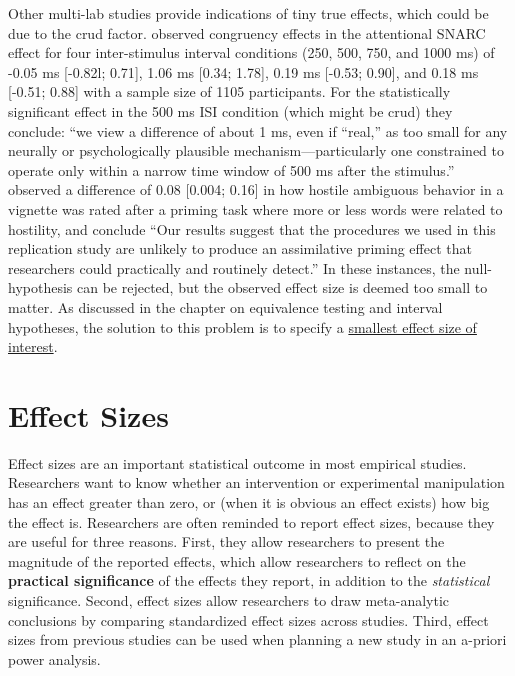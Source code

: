 \documentclass[
  oneside]{krantz}
\begin{document}
Other multi-lab studies provide indications of tiny true effects, which could be due to the crud factor. \citet{colling_registered_2020} observed congruency effects in the attentional SNARC effect for four inter-stimulus interval conditions (250, 500, 750, and 1000 ms) of -0.05 ms {[}-0.82l; 0.71{]}, 1.06 ms {[}0.34; 1.78{]}, 0.19 ms {[}-0.53; 0.90{]}, and 0.18 ms {[}-0.51; 0.88{]} with a sample size of 1105 participants. For the statistically significant effect in the 500 ms ISI condition (which might be crud) they conclude: ``we view a difference of about 1 ms, even if ``real,'' as too small for any neurally or psychologically plausible mechanism---particularly one constrained to operate only within a narrow time window of 500 ms after the stimulus.'' \citet{mccarthy_registered_2018} observed a difference of 0.08 {[}0.004; 0.16{]} in how hostile ambiguous behavior in a vignette was rated after a priming task where more or less words were related to hostility, and conclude ``Our results suggest that the procedures we used in this replication study are unlikely to produce an assimilative priming effect that researchers could practically and routinely detect.'' In these instances, the null-hypothesis can be rejected, but the observed effect size is deemed too small to matter. As discussed in the chapter on equivalence testing and interval hypotheses, the solution to this problem is to specify a \protect\hyperlink{sesoi}{smallest effect size of interest}.

\hypertarget{effectsize}{%
\chapter{Effect Sizes}\label{effectsize}}

Effect sizes are an important statistical outcome in most empirical studies. Researchers want to know whether an intervention or experimental manipulation has an effect greater than zero, or (when it is obvious an effect exists) how big the effect is. Researchers are often reminded to report effect sizes, because they are useful for three reasons. First, they allow researchers to present the magnitude of the reported effects, which allow researchers to reflect on the \textbf{practical significance} of the effects they report, in addition to the \emph{statistical} significance. Second, effect sizes allow researchers to draw meta-analytic conclusions by comparing standardized effect sizes across studies. Third, effect sizes from previous studies can be used when planning a new study in an a-priori power analysis.
\end{document}
